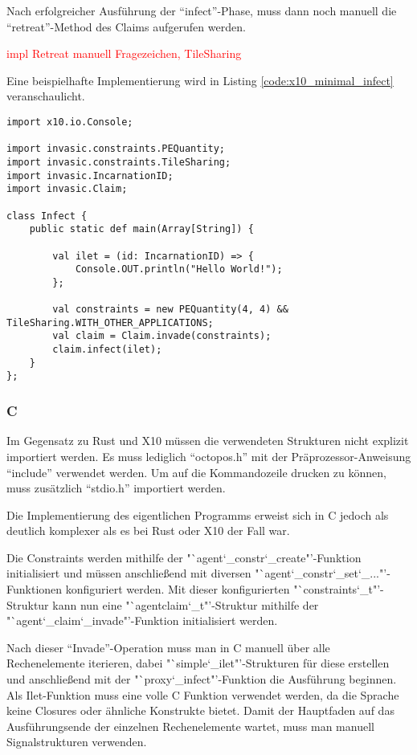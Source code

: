 Nach erfolgreicher Ausführung der "`infect"'-Phase, muss dann noch manuell die "`retreat"'-Method des Claims
aufgerufen werden.

\textcolor{red}{impl Retreat manuell Fragezeichen, TileSharing}

Eine beispielhafte Implementierung wird in Listing \ref{code:x10_minimal_infect} veranschaulicht.

\begin{lstlisting}[float,caption={Minimales Invade, Infect, Retreat in X10},label=code:x10_minimal_infect]
import x10.io.Console;

import invasic.constraints.PEQuantity;
import invasic.constraints.TileSharing;
import invasic.IncarnationID;
import invasic.Claim;

class Infect {
	public static def main(Array[String]) {

	    val ilet = (id: IncarnationID) => {
	        Console.OUT.println("Hello World!");
	    };

	    val constraints = new PEQuantity(4, 4) && TileSharing.WITH_OTHER_APPLICATIONS;
        val claim = Claim.invade(constraints);
        claim.infect(ilet);
	}
};
\end{lstlisting}

\subsubsection{C}

Im Gegensatz zu Rust und X10 müssen die verwendeten Strukturen nicht explizit importiert werden. Es muss lediglich
"`octopos.h"' mit der Präprozessor-Anweisung "`include"' verwendet werden.
Um auf die Kommandozeile drucken zu können, muss zusätzlich "`stdio.h"' importiert werden.

Die Implementierung des eigentlichen Programms erweist sich in C jedoch als deutlich komplexer als es bei
Rust oder X10 der Fall war.

Die Constraints werden mithilfe der "`agent\char`_constr\char`_create"'-Funktion initialisiert
und müssen anschließend mit diversen "`agent\char`_constr\char`_set\char`_..."'-Funktionen konfiguriert werden.
Mit dieser konfigurierten "`constraints\char`_t"'-Struktur kann nun eine "`agentclaim\char`_t"'-Struktur mithilfe
der "`agent\char`_claim\char`_invade"'-Funktion initialisiert werden.

Nach dieser "`Invade"'-Operation muss man in C manuell über alle Rechenelemente iterieren, dabei
"`simple\char`_ilet"'-Strukturen für diese erstellen und anschließend mit der "`proxy\char`_infect"'-Funktion
die Ausführung beginnen. Als Ilet-Funktion muss eine volle C Funktion verwendet werden,
da die Sprache keine Closures oder ähnliche Konstrukte bietet.
Damit der Hauptfaden auf das Ausführungsende der einzelnen Rechenelemente wartet, muss
man manuell Signalstrukturen verwenden.

